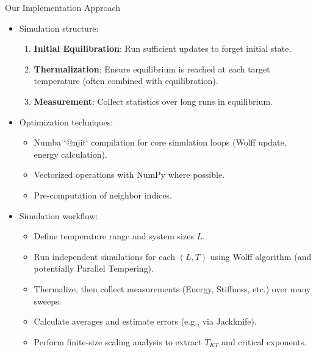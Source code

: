 \documentclass[11pt,aspectratio=169]{beamer}
\begin{document}
\begin{frame}{Our Implementation Approach}
    \begin{itemize}
        \item Simulation structure:
        \begin{enumerate}
            \item \textbf{Initial Equilibration}: Run sufficient updates to forget initial state.
            \item \textbf{Thermalization}: Ensure equilibrium is reached at each target temperature (often combined with equilibration).
            \item \textbf{Measurement}: Collect statistics over long runs in equilibrium.
        \end{enumerate}
        \pause
        \item Optimization techniques:
        \begin{itemize}
            \item Numba `@njit` compilation for core simulation loops (Wolff update, energy calculation).
            \item Vectorized operations with NumPy where possible.
            \item Pre-computation of neighbor indices.
        \end{itemize}
        \pause
        \item Simulation workflow:
        \begin{itemize}
            \item Define temperature range and system sizes $L$.
            \item Run independent simulations for each $(L, T)$ using Wolff algorithm (and potentially Parallel Tempering).
            \item Thermalize, then collect measurements (Energy, Stiffness, etc.) over many sweeps.
            \item Calculate averages and estimate errors (e.g., via Jackknife).
            \item Perform finite-size scaling analysis to extract $T_{KT}$ and critical exponents.
        \end{itemize}
    \end{itemize}
\end{frame}
\end{document}
